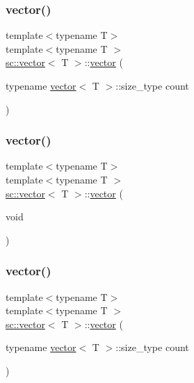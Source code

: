 \subsubsection{\texorpdfstring{vector()}{vector()}\hspace{0.1cm}{\footnotesize\ttfamily [6/11]}}
{\footnotesize\ttfamily template$<$typename T$>$ \\
template$<$typename T $>$ \\
\mbox{\hyperlink{classsc_1_1vector}{sc\+::vector}}$<$ T $>$\+::\mbox{\hyperlink{classsc_1_1vector}{vector}} (\begin{DoxyParamCaption}\item[{typename \mbox{\hyperlink{classsc_1_1vector}{vector}}$<$ T $>$\+::size\+\_\+type}]{count }\end{DoxyParamCaption})}

\mbox{\label{classsc_1_1vector_a64ed605fc5b5449da4c90177268ff101}} 
\subsubsection{\texorpdfstring{vector()}{vector()}\hspace{0.1cm}{\footnotesize\ttfamily [7/11]}}
{\footnotesize\ttfamily template$<$typename T$>$ \\
template$<$typename T $>$ \\
\mbox{\hyperlink{classsc_1_1vector}{sc\+::vector}}$<$ T $>$\+::\mbox{\hyperlink{classsc_1_1vector}{vector}} (\begin{DoxyParamCaption}\item[{void}]{ }\end{DoxyParamCaption})}

\mbox{\label{classsc_1_1vector_a09edcd127164af330873721038aa4ccc}} 
\subsubsection{\texorpdfstring{vector()}{vector()}\hspace{0.1cm}{\footnotesize\ttfamily [8/11]}}
{\footnotesize\ttfamily template$<$typename T$>$ \\
template$<$typename T $>$ \\
\mbox{\hyperlink{classsc_1_1vector}{sc\+::vector}}$<$ T $>$\+::\mbox{\hyperlink{classsc_1_1vector}{vector}} (\begin{DoxyParamCaption}\item[{typename \mbox{\hyperlink{classsc_1_1vector}{vector}}$<$ T $>$\+::size\+\_\+type}]{count }\end{DoxyParamCaption})}

